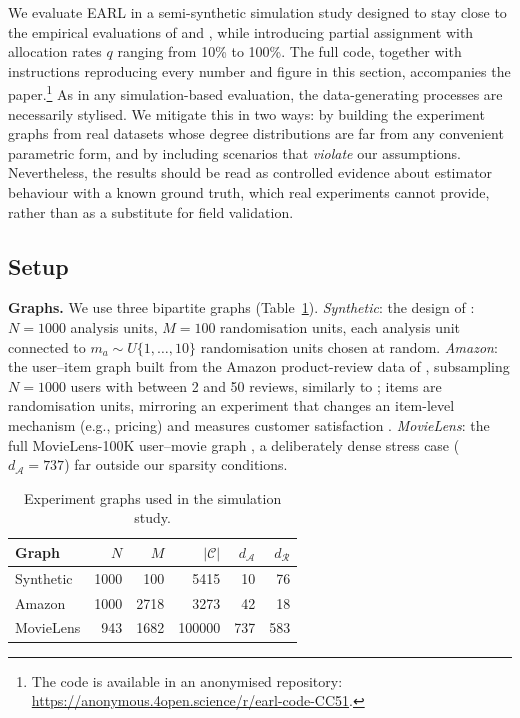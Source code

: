 \documentclass[sigconf,nonacm]{acmart}
\newcounter{assumption}
\begin{document}
We evaluate EARL in a semi-synthetic simulation study designed to stay close to the empirical evaluations of \citet{doudchenko2020causal} and \citet{harshaw2023erl}, while introducing partial assignment with allocation rates $q$ ranging from 10\% to 100\%. The full code, together with instructions reproducing every number and figure in this section, accompanies the paper.\footnote{The code is available in an anonymised repository: \url{https://anonymous.4open.science/r/earl-code-CC51}.} As in any simulation-based evaluation, the data-generating processes are necessarily stylised. We mitigate this in two ways: by building the experiment graphs from real datasets whose degree distributions are far from any convenient parametric form, and by including scenarios that \emph{violate} our assumptions. Nevertheless, the results should be read as controlled evidence about estimator behaviour with a known ground truth, which real experiments cannot provide, rather than as a substitute for field validation.

\subsection{Setup}\label{subsec:sim-setup}

\textbf{Graphs.} We use three bipartite graphs (Table~\ref{tab:graphs}). \emph{Synthetic}: the design of \cite[Section~6.1]{doudchenko2020causal}: $N=1000$ analysis units, $M=100$ randomisation units, each analysis unit connected to $m_a\sim U\{1,\ldots,10\}$ randomisation units chosen at random. \emph{Amazon}: the user--item graph built from the Amazon product-review data of \citet{he2016ups,mcauley2015image}, subsampling $N=1000$ users with between 2 and 50 reviews, similarly to \cite[Section~6.2]{doudchenko2020causal}; items are randomisation units, mirroring an experiment that changes an item-level mechanism (e.g., pricing) and measures customer satisfaction \cite{harshaw2023erl}. \emph{MovieLens}: the full MovieLens-100K user--movie graph \cite{harper2015movielens}, a deliberately dense stress case ($d_{\mathcal A}=737$) far outside our sparsity conditions.

\begin{table}
\caption{Experiment graphs used in the simulation study.}
\label{tab:graphs}
\begin{tabular}{lrrrrr}
\toprule
Graph & $N$ & $M$ & $|\mathcal C|$ & $d_{\mathcal A}$ & $d_{\mathcal R}$\\
\midrule
Synthetic & 1000 & 100 & 5415 & 10 & 76\\
Amazon & 1000 & 2718 & 3273 & 42 & 18\\
MovieLens & 943 & 1682 & 100000 & 737 & 583\\
\bottomrule
\end{tabular}
\end{table}
\end{document}
